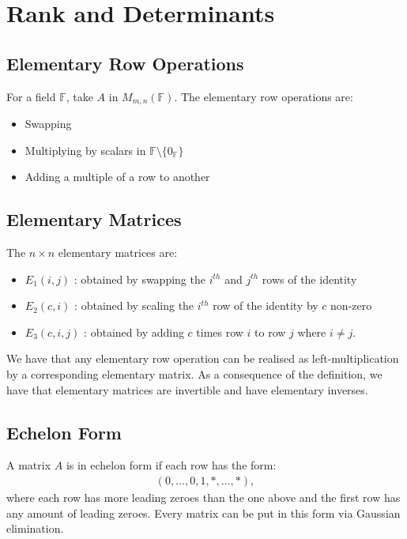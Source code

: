 \documentclass[a4paper, 12pt, twoside]{article}
\begin{document}
\section{Rank and Determinants}

\subsection{Elementary Row Operations}

For a field $\mathbb{F}$, take $A$ in $M_{m,n}(\mathbb{F})$. The elementary
row operations are: \begin{itemize}
  \item Swapping
  \item Multiplying by scalars in $\mathbb{F}\setminus\{0_\mathbb{F}\}$
  \item Adding a multiple of a row to another
\end{itemize}

\subsection{Elementary Matrices}

The $n \times n$ elementary matrices are: \begin{itemize}
  \item $E_1(i, j)$ : obtained by swapping the $i^{th}$ and $j^{th}$ rows
  of the identity
  \item $E_2(c, i)$ : obtained by scaling the $i^{th}$ row of the identity
  by $c$ non-zero
  \item $E_3(c, i, j)$ : obtained by adding $c$ times row $i$ to row $j$
  where $i \neq j$.
\end{itemize} We have that any elementary row operation can be realised as
left-multiplication by a corresponding elementary matrix. As a consequence
of the definition, we have that elementary matrices are invertible and
have elementary inverses.

\subsection{Echelon Form}

A matrix $A$ is in echelon form if each row has the form: \begin{gather*}
  (0, \ldots, 0, 1, *, \ldots, *),
\end{gather*} where each row has more leading zeroes than the one above and
the first row has any amount of leading zeroes. Every matrix can be put in
this form via Gaussian elimination.
\end{document}
